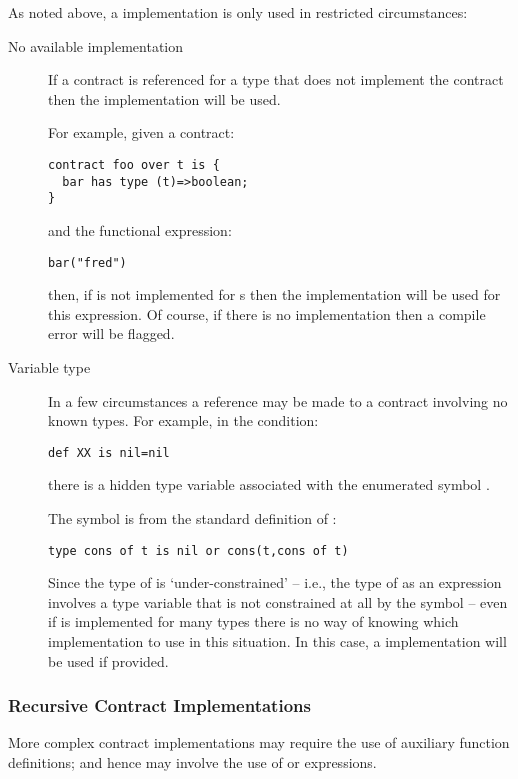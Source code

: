 As noted above, a  implementation is only used in restricted circumstances:
\begin{description}
\item[No available implementation] If a contract is referenced for a type that does not implement the contract then the  implementation will be used. 

For example, given a contract:
\begin{lstlisting}
contract foo over t is {
  bar has type (t)=>boolean;
}
\end{lstlisting}
and the functional expression:
\begin{lstlisting}
bar("fred")
\end{lstlisting}
then, if  is not implemented for s then the  implementation will be used for this expression. Of course, if there is no  implementation then a compile error will be flagged.
\item[Variable type]
In a few circumstances a reference may be made to a contract involving no known types. For example, in the condition:
\begin{lstlisting}
def XX is nil=nil
\end{lstlisting}
there is a hidden type variable associated with the enumerated symbol . 
\begin{aside}
The symbol  is from the standard definition of :
\begin{lstlisting}
type cons of t is nil or cons(t,cons of t)
\end{lstlisting}
\end{aside}
Since the type of  is `under-constrained' -- i.e., the type of  as an expression involves a type variable that is not constrained at all by the  symbol -- even if  is implemented for many types there is no way of knowing which implementation to use in this situation. In this case, a  implementation will be used if provided.
\end{description}


\subsubsection{Recursive Contract Implementations}

More complex contract implementations may require the use of auxiliary function definitions; and hence may involve the use of  or  expressions.


